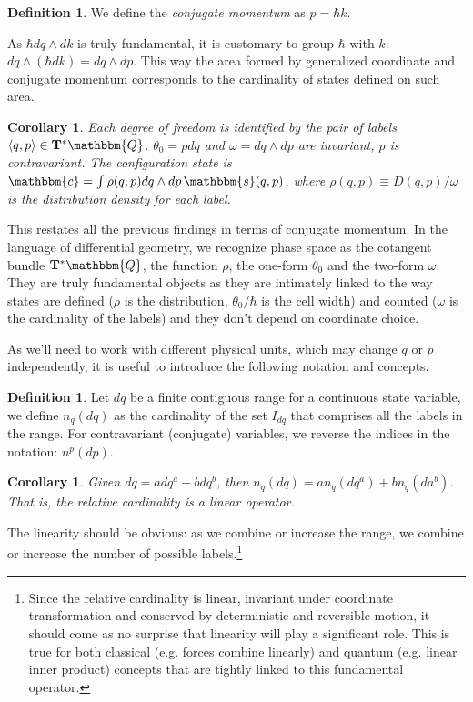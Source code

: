 \documentclass[aps,pra,10pt,twocolumn,floatfix,nofootinbib]{revtex4-1}
\newtheorem{cor}[thm]{Corollary}
\theoremstyle{definition}
\newtheorem{defn}[thm]{Definition}
\begin{document}
\begin{defn}\label{conjugateMomentum}
We define the \emph{conjugate momentum} as $p=\hbar k$.
\end{defn}

As $\hbar dq \wedge dk$ is truly fundamental, it is customary to group $\hbar$ with $k$: $dq \wedge (\hbar dk) = dq \wedge dp$. This way the area formed by generalized coordinate and conjugate momentum corresponds to the cardinality of states defined on such area.

\begin{cor}\label{continuousConjugateRelationships}
Each degree of freedom is identified by the pair of labels $\langle q,p \rangle \in \mathbf{T}^*\mathbbm{Q}$. $\theta_0 = p dq$ and $\omega = dq \wedge dp$ are invariant, $p$ is contravariant. The configuration state is $\mathbbm{c}=\int \rho(q,p) dq \wedge dp \, \mathbbm{s}(q, p)$, where $\rho(q,p)\equiv D(q,p) / \omega$ is the distribution density for each label.
\end{cor}

This restates all the previous findings in terms of conjugate momentum. In the language of differential geometry, we recognize phase space as the cotangent bundle $\mathbf{T}^*\mathbbm{Q}$, the function $\rho$, the one-form $\theta_0$ and the two-form $\omega$. They are truly fundamental objects as they are intimately linked to the way states are defined ($\rho$ is the distribution, $\theta_0 / \hbar$ is the cell width) and counted ($\omega$ is the cardinality of the labels) and they don't depend on coordinate choice.

As we'll need to work with different physical units, which may change $q$ or $p$ independently, it is useful to introduce the following notation and concepts.

\begin{defn}\label{differentialCardinality}
Let $dq$ be a finite contiguous range for a continuous state variable, we define $n_q(dq)$ as the cardinality of the set $I_{dq}$ that comprises all the labels in the range. For contravariant (conjugate) variables, we reverse the indices in the notation: $n^p(dp)$.
\end{defn}

\begin{cor}\label{linearCardinality}
Given $dq = a dq^a + b dq^b$, then $n_q(dq) = a n_q(dq^a) + b n_q(da^b)$. That is, the relative cardinality is a linear operator.
\end{cor}

The linearity should be obvious: as we combine or increase the range, we combine or increase the number of possible labels.\footnote{Since the relative cardinality is linear, invariant under coordinate transformation and conserved by deterministic and reversible motion, it should come as no surprise that linearity will play a significant role. This is true for both classical (e.g. forces combine linearly) and quantum (e.g. linear inner product) concepts that are tightly linked to this fundamental operator.}
\end{document}
